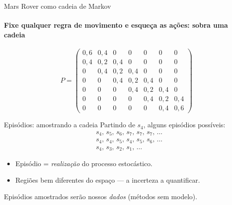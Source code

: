 \documentclass[aspectratio=169, 11pt]{beamer}
\begin{document}
\begin{frame}{Mars Rover como cadeia de Markov}
  \framesubtitle{Fixe qualquer regra de movimento e esqueça as ações: sobra uma cadeia}
  \begin{center}
  \end{center}

  \vspace{-0.3em}
  \[
    P =
    \begin{pmatrix}
      0{,}6 & 0{,}4 & 0     & 0     & 0     & 0     & 0     \\
      0{,}4 & 0{,}2 & 0{,}4 & 0     & 0     & 0     & 0     \\
      0     & 0{,}4 & 0{,}2 & 0{,}4 & 0     & 0     & 0     \\
      0     & 0     & 0{,}4 & 0{,}2 & 0{,}4 & 0     & 0     \\
      0     & 0     & 0     & 0{,}4 & 0{,}2 & 0{,}4 & 0     \\
      0     & 0     & 0     & 0     & 0{,}4 & 0{,}2 & 0{,}4 \\
      0     & 0     & 0     & 0     & 0     & 0{,}4 & 0{,}6
    \end{pmatrix}
  \]
\end{frame}

\begin{frame}{Episódios: amostrando a cadeia}
  Partindo de $s_4$, alguns episódios possíveis:
  \begin{align*}
    &s_4,\, s_5,\, s_6,\, s_7,\, s_7,\, s_7,\, \ldots \\
    &s_4,\, s_4,\, s_5,\, s_4,\, s_5,\, s_6,\, \ldots \\
    &s_4,\, s_3,\, s_2,\, s_1,\, \ldots
  \end{align*}

  \begin{itemize}
    \item Episódio = \emph{realização} do processo estocástico.
    \item Regiões bem diferentes do espaço — a incerteza a quantificar.
  \end{itemize}

  \begin{ideiabox}
    Episódios amostrados serão nossos \emph{dados} (métodos sem modelo).
  \end{ideiabox}
\end{frame}
\end{document}
